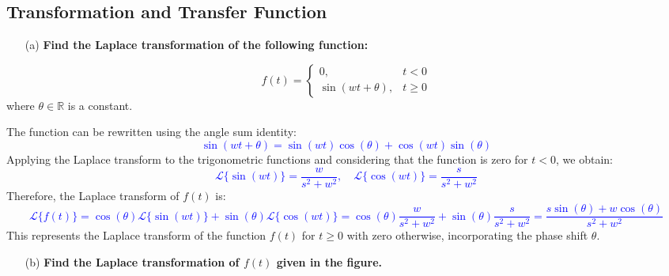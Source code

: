 \documentclass[12pt]{article}
\begin{document}
\subsection*{Transformation and Transfer Function}
\begin{enumerate}
	\item[(a)] \textbf{Find the Laplace transformation of the following function:}
\end{enumerate}   
\[
	f(t) = 
	\begin{cases} 
		0,                 & t < 0    \\
		\sin(wt + \theta), & t \geq 0 
	\end{cases}
\]
where \( \theta \in \mathbb{R} \) is a constant.

\noindent The function can be rewritten using the angle sum identity:
\textcolor{blue}{\[
	\sin(wt + \theta) = \sin(wt)\cos(\theta) + \cos(wt)\sin(\theta)
\]}
Applying the Laplace transform to the trigonometric functions and considering that the function is zero for \( t < 0 \), we obtain:
\textcolor{blue}{\[
	\mathcal{L}\{\sin(wt)\} = \frac{w}{s^2 + w^2}, \quad \mathcal{L}\{\cos(wt)\} = \frac{s}{s^2 + w^2}
\]}
Therefore, the Laplace transform of \( f(t) \) is:
\textcolor{blue}{\[
	\boxed{\mathcal{L}\{f(t)\} = \cos(\theta) \mathcal{L}\{\sin(wt)\} + \sin(\theta) \mathcal{L}\{\cos(wt)\}
		= \cos(\theta) \frac{w}{s^2 + w^2} + \sin(\theta) \frac{s}{s^2 + w^2}
		= \frac{s \sin(\theta) + w \cos(\theta)}{s^2 + w^2}}
\]}
This represents the Laplace transform of the function \( f(t) \) for \( t \geq 0 \) with zero otherwise, incorporating the phase shift \( \theta \).
\newpage
\begin{enumerate}
	\item[(b)] \textbf{Find the Laplace transformation of $f(t)$ given in the figure.}
\end{enumerate}
	      
\end{document}
